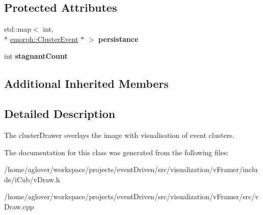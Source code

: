\subsection*{Protected Attributes}
\begin{DoxyCompactItemize}
\item 
\hypertarget{classemorph_1_1clusterDraw_aa11ffa556c87a09201503826bce2317c}{std\-::map$<$ int, \\*
\hyperlink{classemorph_1_1ClusterEvent}{emorph\-::\-Cluster\-Event} $\ast$ $>$ {\bfseries persistance}}\label{classemorph_1_1clusterDraw_aa11ffa556c87a09201503826bce2317c}

\item 
\hypertarget{classemorph_1_1clusterDraw_a34d64c050eb0fe5a078c5903bb3c9779}{int {\bfseries stagnant\-Count}}\label{classemorph_1_1clusterDraw_a34d64c050eb0fe5a078c5903bb3c9779}

\end{DoxyCompactItemize}
\subsection*{Additional Inherited Members}


\subsection{Detailed Description}
The cluster\-Drawer overlays the image with visualisation of event clusters. 

The documentation for this class was generated from the following files\-:\begin{DoxyCompactItemize}
\item 
/home/aglover/workspace/projects/event\-Driven/src/visualization/v\-Framer/include/i\-Cub/v\-Draw.\-h\item 
/home/aglover/workspace/projects/event\-Driven/src/visualization/v\-Framer/src/v\-Draw.\-cpp\end{DoxyCompactItemize}
